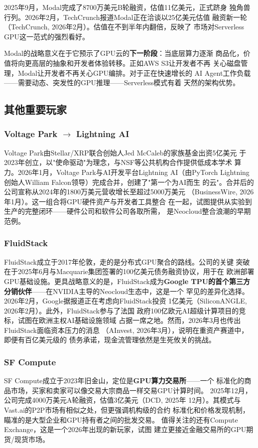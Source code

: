 2025年9月，Modal完成了8700万美元B轮融资，估值11亿美元，正式跻身
独角兽行列。2026年2月，TechCrunch报道Modal正在洽谈以25亿美元估值
融资新一轮（TechCrunch, 2026年2月）。估值在不到半年内翻倍，反映了
市场对Serverless GPU这一范式的强烈看好。

Modal的战略意义在于它预示了GPU云的\textbf{下一阶段}：当底层算力逐渐
商品化，价值将向更高层的抽象和开发者体验转移。正如AWS S3让开发者不再
关心磁盘管理，Modal让开发者不再关心GPU编排。对于正在快速增长的
AI Agent工作负载——需要动态、突发性的GPU推理——Serverless模式有着
天然的架构优势。

\subsection{其他重要玩家}
\label{subsec:gpu-cloud-others}

\subsubsection{Voltage Park $\to$ Lightning AI}
Voltage Park由Stellar/XRP联合创始人Jed McCaleb的家族基金出资5亿美元
于2023年创立，以"使命驱动"为理念，与NSF等公共机构合作提供低成本学术
算力。2026年1月，Voltage Park与AI开发平台Lightning AI（由PyTorch
Lightning创始人William Falcon领导）完成合并，创建了"第一个为AI而生
的云"。合并后的公司宣称从2024年的1800万美元营收增长至超过5000万美元
（BusinessWire, 2026年1月）。这一组合将GPU硬件资产与开发者工具整合
在一起，试图提供从实验到生产的完整闭环——硬件公司和软件公司各取所需，
是Neocloud整合浪潮的早期范例。

\subsubsection{FluidStack}
FluidStack成立于2017年伦敦，走的是分布式GPU聚合的路线。公司的关键
突破在于2025年6月与Macquarie集团签署的100亿美元债务融资协议，用于在
欧洲部署GPU基础设施。更具战略意义的是，FluidStack成为\textbf{Google
TPU的首个第三方分销伙伴}——在NVIDIA主导的Neocloud生态中，这是一个
罕见的差异化选择。2026年2月，Google据报道正在考虑向FluidStack投资
1亿美元（SiliconANGLE, 2026年2月）。此外，FluidStack参与了法国
政府100亿欧元AI超级计算项目的竞标，试图在欧洲主权AI基础设施领域
占据一席之地。然而，2026年3月也传出FluidStack面临资本压力的消息
（AInvest, 2026年3月），说明在重资产赛道中，即便有百亿美元级的
债务承诺，现金流管理依然是生死攸关的挑战。

\subsubsection{SF Compute}
SF Compute成立于2023年旧金山，定位是\textbf{GPU算力交易所}——一个
标准化的商品市场，买家和卖家可以像交易大宗商品一样交易GPU计算时间。
2025年12月，公司完成4000万美元A轮融资，估值3亿美元（DCD, 2025年
12月）。其模式与Vast.ai的P2P市场有相似之处，但更强调机构级的合约
标准化和价格发现机制，瞄准的是大型企业和GPU持有者之间的批发交易。
值得关注的还有Compute Exchange，这是一个2026年出现的新玩家，试图
建立更接近金融交易所的GPU期货/现货市场。

